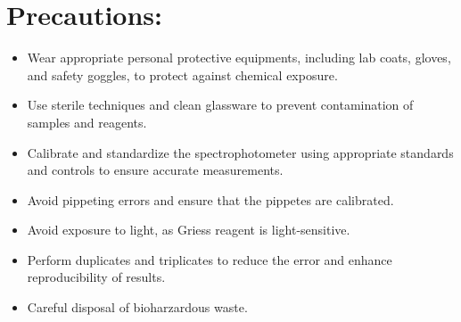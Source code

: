 \documentclass{report}
\begin{document}
\section*{Precautions:}

\begin{itemize}
  \item Wear appropriate personal protective equipments, including lab coats, gloves, and safety goggles,
         to protect against chemical exposure.
  \item Use sterile techniques and clean glassware to prevent contamination of samples and reagents.
  \item Calibrate and standardize the spectrophotometer using appropriate standards and 
         controls to ensure accurate measurements.
  \item Avoid pippeting errors and ensure that the pippetes are calibrated.
  \item Avoid exposure to light, as Griess reagent is light-sensitive.
  \item Perform duplicates and triplicates to reduce the error and enhance reproducibility of results.
  \item Careful disposal of bioharzardous waste.
\end{itemize}
\end{document}
